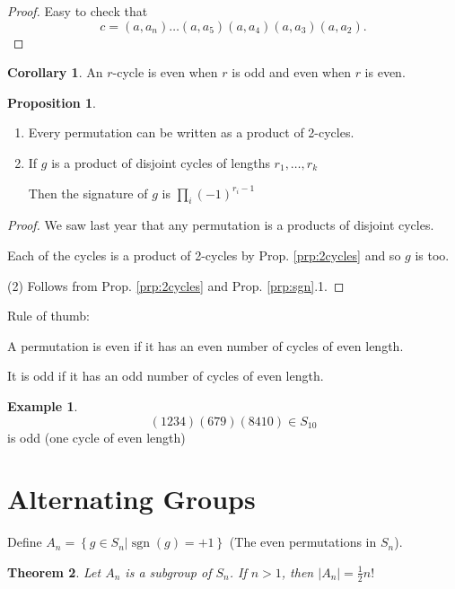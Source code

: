 \documentclass{article}
\newtheorem{theorem}{Theorem}
\theoremstyle{definition}
\newtheorem{proposition}[theorem]{Proposition}
\newtheorem*{corollary}{Corollary}
\newtheorem*{exmp}{Example}
\DeclareMathOperator{\sgn}{sgn}
\begin{document}
\begin{proof}
  Easy to check that
    $$c=(a,a_n)\ldots(a,a_5)(a,a_4)(a,a_3)(a,a_2).$$
\end{proof}

\begin{corollary}
  An $r$-cycle is even when $r$ is odd and even when $r$ is even.\\
\end{corollary}

\begin{proposition}\hfill
  \begin{enumerate}
    \item Every permutation can be written as a product of 2-cycles.
    \item If $g$ is a product of disjoint cycles of lengths $r_1, \ldots, r_k$

      Then the signature of $g$ is $\prod_{i} (-1)^{r_i - 1}$
  \end{enumerate}
\end{proposition}

\begin{proof}
  We saw last year that any permutation is a products of disjoint cycles.

  Each of the cycles is a product of 2-cycles by Prop. \ref{prp:2cycles} and so $g$ is too.

  (2) Follows from Prop. \ref{prp:2cycles} and Prop. \ref{prp:sgn}.1.
\end{proof}

Rule of thumb:

A permutation is even if it has an even number of cycles of even length.

It is odd if it has an odd number of cycles of even length.\\

\begin{exmp}
$$(1 2 3 4)(6 7 9)(8 4 10) \in S_{10}$$ is odd (one cycle of even length)
\end{exmp}


\section{Alternating Groups}

Define $A_n=\left\{ g \in S_n | \sgn(g) = +1 \right\}$ (The even permutations in $S_n$).\\

\begin{theorem}
  Let $A_n$ is a subgroup of $S_n$. If $n>1$, then $|A_n|=\frac{1}{2}n!$
  \label{thm:subgroup}
\end{theorem}
\end{document}
